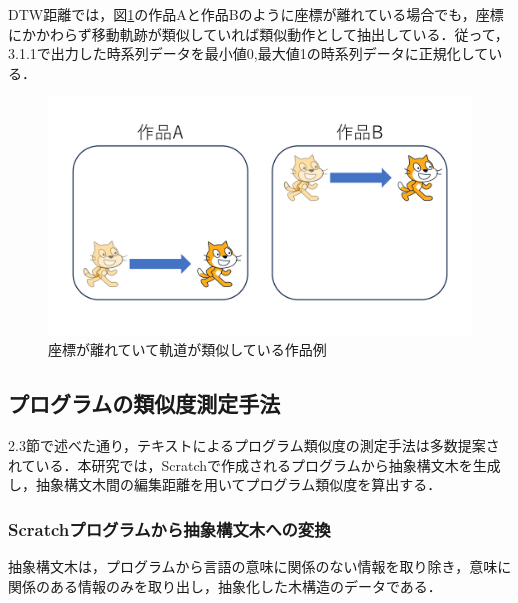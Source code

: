 \documentclass[T,J]{fose} %
\begin{document}
DTW距離では，図\ref{fig:coordinate}の作品Aと作品Bのように座標が離れている場合でも，座標にかかわらず移動軌跡が類似していれば類似動作として抽出している．従って，3.1.1で出力した時系列データを最小値0,最大値1の時系列データに正規化している．
\begin{figure}[t]
	\centering
	\includegraphics[width=1.0\linewidth]{Okamoto_fig/coordinate.pdf}
 \vspace{-5mm}
	\caption{座標が離れていて軌道が類似している作品例}
	\label{fig:coordinate}
\end{figure}

\subsection{プログラムの類似度測定手法}\label{subsec:Similarity program measurement}

2.3節で述べた通り，テキストによるプログラム類似度の測定手法は多数提案されている．本研究では，Scratchで作成されるプログラムから抽象構文木を生成し，抽象構文木間の編集距離を用いてプログラム類似度を算出する．

\subsubsection{Scratchプログラムから抽象構文木への変換}

抽象構文木は，プログラムから言語の意味に関係のない情報を取り除き，意味に関係のある情報のみを取り出し，抽象化した木構造のデータである．
\end{document}
